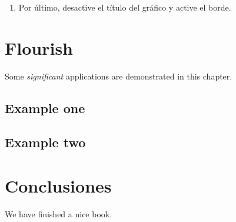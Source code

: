 \documentclass[
]{book}
\providecommand{\tightlist}{%
  \setlength{\itemsep}{0pt}\setlength{\parskip}{0pt}}
\begin{document}
\begin{enumerate}
\def\labelenumi{\arabic{enumi}.}
\setcounter{enumi}{6}
\tightlist
\item
  Por último, desactive el título del gráfico y active el borde.
\end{enumerate}

\hypertarget{flourish}{%
\chapter{Flourish}\label{flourish}}

Some \emph{significant} applications are demonstrated in this chapter.

\hypertarget{example-one}{%
\section{Example one}\label{example-one}}

\hypertarget{example-two}{%
\section{Example two}\label{example-two}}

\hypertarget{conclu}{%
\chapter{Conclusiones}\label{conclu}}

We have finished a nice book.

  
\end{document}

